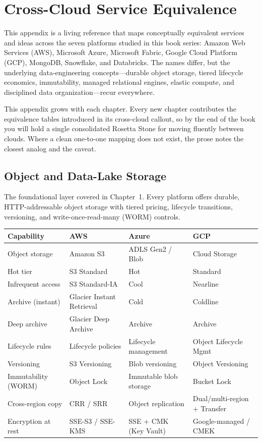 \chapter{Cross-Cloud Service Equivalence}
%
This appendix is a living reference that maps conceptually equivalent services and
ideas across the seven platforms studied in this book series: Amazon Web Services
(AWS), Microsoft Azure, Microsoft Fabric, Google Cloud Platform (GCP), MongoDB,
Snowflake, and Databricks. The names differ, but the underlying data-engineering
concepts---durable object storage, tiered lifecycle economics, immutability, managed
relational engines, elastic compute, and disciplined data organization---recur
everywhere.

\begin{notebox}
This appendix grows with each chapter. Every new chapter contributes the equivalence
tables introduced in its cross-cloud callout, so by the end of the book you will hold
a single consolidated Rosetta Stone for moving fluently between clouds. Where a clean
one-to-one mapping does not exist, the prose notes the closest analog and the caveat.
\end{notebox}

\section{Object and Data-Lake Storage}
%
The foundational layer covered in Chapter~1. Every platform offers durable, HTTP-addressable
object storage with tiered pricing, lifecycle transitions, versioning, and write-once-read-many
(WORM) controls.

\begin{center}
\footnotesize
\begin{tabular}{@{}p{2.8cm}p{3.2cm}p{3.2cm}p{3.2cm}@{}}
\toprule
\textbf{Capability} & \textbf{AWS} & \textbf{Azure} & \textbf{GCP} \\
\midrule
Object storage & Amazon S3 & ADLS Gen2 / Blob & Cloud Storage \\
Hot tier & S3 Standard & Hot & Standard \\
Infrequent access & S3 Standard-IA & Cool & Nearline \\
Archive (instant) & Glacier Instant Retrieval & Cold & Coldline \\
Deep archive & Glacier Deep Archive & Archive & Archive \\
Lifecycle rules & Lifecycle policies & Lifecycle management & Object Lifecycle Mgmt \\
Versioning & S3 Versioning & Blob versioning & Object Versioning \\
Immutability (WORM) & Object Lock & Immutable blob storage & Bucket Lock \\
Cross-region copy & CRR / SRR & Object replication & Dual/multi-region + Transfer \\
Encryption at rest & SSE-S3 / SSE-KMS & SSE + CMK (Key Vault) & Google-managed / CMEK \\
\bottomrule
\end{tabular}
\end{center}

